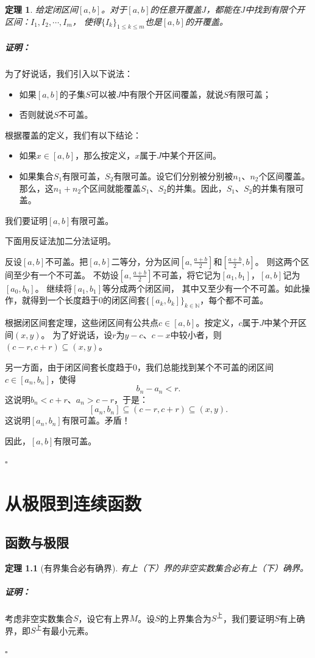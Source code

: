 \documentclass[12pt,UTF8]{ctexbook}
\newtheorem{tm}{定理}[section]
\renewenvironment{proof}{\paragraph{\textbf{证明：}}}{\hfill$\square$}
\begin{document}
\begin{appendix}
\begin{tm}
    给定闭区间$[a, b]$。对于$[a, b]$的任意开覆盖$J$，都能在$J$中找到有限个开区间：$I_1, I_2, \cdots, I_m$，
    使得$\{I_k\}_{1\leqslant k\leqslant m}$也是$[a, b]$的开覆盖。
\end{tm}
\begin{proof}
    为了好说话，我们引入以下说法：
    \begin{itemize}
        \item 如果$[a, b]$的子集$S$可以被$J$中有限个开区间覆盖，就说$S$有限可盖；
        \item 否则就说$S$不可盖。
    \end{itemize}
    根据覆盖的定义，我们有以下结论：
    \begin{itemize}
        \item 如果$x\in[a, b]$，那么按定义，$x$属于$J$中某个开区间。
        \item 如果集合$S_1$有限可盖，$S_2$有限可盖。设它们分别被分别被$n_1$、$n_2$个区间覆盖。
        那么，这$n_1 + n_2$个区间就能覆盖$S_1$、$S_2$的并集。因此，$S_1$、$S_2$的并集有限可盖。
    \end{itemize}
    
    我们要证明$[a, b]$有限可盖。

    下面用反证法加二分法证明。

    反设$[a, b]$不可盖。把$[a, b]$二等分，分为区间$[a, \frac{a+b}{2}]$和$[\frac{a+b}{2}, b]$。
    则这两个区间至少有一个不可盖。
    不妨设$[a, \frac{a+b}{2}]$不可盖，将它记为$[a_1, b_1]$，$[a, b]$记为$[a_0, b_0]$。
    继续将$[a_1, b_1]$等分成两个闭区间，
    其中又至少有一个不可盖。如此操作，就得到一个长度趋于$0$的闭区间套$\{[a_k, b_k]\}_{k\in\mathbb{N}}$，每个都不可盖。

    根据闭区间套定理，这些闭区间有公共点$c\in[a, b]$。按定义，$c$属于$J$中某个开区间$(x, y)$。
    为了好说话，设$r$为$y-c$、$c-x$中较小者，则$(c-r, c+r)\subseteq (x, y)$。

    另一方面，由于闭区间套长度趋于$0$，我们总能找到某个不可盖的闭区间$c\in [a_n, b_n]$，使得
    $$ b_n - a_n < r.$$
    这说明$b_n < c+r$、$a_n>c-r$，于是：
    $$[a_n, b_n] \subseteq (c-r, c+r) \subseteq (x, y). $$
    这说明$[a_n, b_n]$有限可盖。矛盾！

    因此，$[a, b]$有限可盖。

\end{proof}

\chapter{从极限到连续函数}
\section{函数与极限}
\begin{tm}[有界集合必有确界]\label{tm:b-0-0}
    有上（下）界的非空实数集合必有上（下）确界。
\end{tm}
\begin{proof}
    考虑非空实数集合$S$，设它有上界$M$。设$S$的上界集合为$S^{\text{上}}$，我们要证明$S$有上确界，即$S^{\text{上}}$有最小元素。


\end{proof}
\end{appendix}
\end{document}
